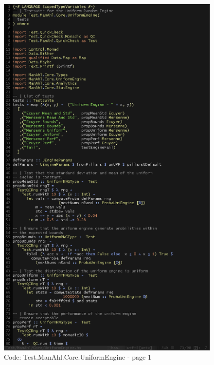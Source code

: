 \documentclass[12pt,a4paper,article]{memoir} %
\begin{document}
\begin{figure}[h!]
\centering
\includegraphics[width=1\textwidth]{img/code-test-uni-1.png}
\caption{Code: Test.ManAhl.Core.UniformEngine - page 1}
\label{fig:test.u1}
\end{figure}
\end{document}
